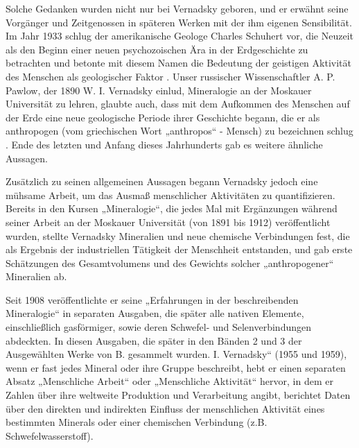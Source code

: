 \documentclass[11pt,a4paper]{article}
\begin{document}
Solche Gedanken wurden nicht nur bei Vernadsky geboren, und er erwähnt seine
Vorgänger und Zeitgenossen in späteren Werken mit der ihm eigenen
Sensibilität. Im Jahr 1933 schlug der amerikanische Geologe Charles Schuhert
vor, die Neuzeit als den Beginn einer neuen psychozoischen Ära in der
Erdgeschichte zu betrachten und betonte mit diesem Namen die Bedeutung der
geistigen Aktivität des Menschen als geologischer Faktor
\cite[S. 80]{Schuchert1933}. Unser russischer Wissenschaftler A. P. Pawlow,
der 1890 W. I. Vernadsky einlud, Mineralogie an der Moskauer Universität zu
lehren, glaubte auch, dass mit dem Aufkommen des Menschen auf der Erde eine
neue geologische Periode ihrer Geschichte begann, die er als anthropogen (vom
griechischen Wort „anthropos“ - Mensch) zu bezeichnen schlug
\cite{Pavlov1922}. Ende des letzten und Anfang dieses Jahrhunderts gab es
weitere ähnliche Aussagen.

Zusätzlich zu seinen allgemeinen Aussagen begann Vernadsky jedoch eine mühsame
Arbeit, um das Ausmaß menschlicher Aktivitäten zu quantifizieren. Bereits in
den Kursen „Mineralogie“, die jedes Mal mit Ergänzungen während seiner Arbeit
an der Moskauer Universität (von 1891 bis 1912) veröffentlicht wurden, stellte
Vernadsky Mineralien und neue chemische Verbindungen fest, die als Ergebnis
der industriellen Tätigkeit der Menschheit entstanden, und gab erste
Schätzungen des Gesamtvolumens und des Gewichts solcher „anthropogener“
Mineralien ab.

Seit 1908 veröffentlichte er seine „Erfahrungen in der beschreibenden
Mineralogie“ in separaten Ausgaben, die später alle nativen Elemente,
einschließlich gasförmiger, sowie deren Schwefel- und Selenverbindungen
abdeckten. In diesen Ausgaben, die später in den Bänden 2 und 3 der
Ausgewählten Werke von B. gesammelt wurden. I. Vernadsky“ (1955 und 1959),
wenn er fast jedes Mineral oder ihre Gruppe beschreibt, hebt er einen
separaten Absatz „Menschliche Arbeit“ oder „Menschliche Aktivität“ hervor, in
dem er Zahlen über ihre weltweite Produktion und Verarbeitung angibt,
berichtet Daten über den direkten und indirekten Einfluss der menschlichen
Aktivität eines bestimmten Minerals oder einer chemischen Verbindung
(z.B. Schwefelwasserstoff).
\end{document}
